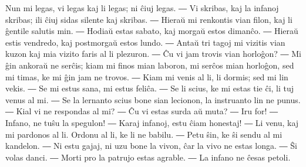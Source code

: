 \newpage %


Nun mi legas, vi legas kaj li legas; ni ĉiuj legas. ― Vi skribas, kaj la infanoj skribas; ili ĉiuj sidas silente kaj skribas. ― Hieraŭ mi renkontis vian filon, kaj li ĝentile salutis min. ― Hodiaŭ estas sabato, kaj morgaŭ estos dimanĉo. ― Hieraŭ estis vendredo, kaj postmorgaŭ estos lundo. ― Antaŭ tri tagoj mi vizitis vian kuzon kaj mia vizito faris al li plezuron. ― Ĉu vi jam trovis vian horloĝon? ― Mi ĝin ankoraŭ ne serĉis; kiam mi finos mian laboron, mi serĉos mian horloĝon, sed mi timas, ke mi ĝin jam ne trovos. ― Kiam mi venis al li, li dormis; sed mi lin vekis. ― Se mi estus sana, mi estus feliĉa. ― Se li scius, ke mi estas tie ĉi, li tuj venus al mi. ― Se la lernanto scius bone sian lecionon, la instruanto lin ne punus. ― Kial vi ne respondas al mi? ― Ĉu vi estas surda aŭ muta? ― Iru for! ― Infano, ne tuŝu la spegulon! ― Karaj infanoj, estu ĉiam honestaj! ― Li venu, kaj mi pardonos al li. Ordonu al li, ke li ne babilu. ― Petu ŝin, ke ŝi sendu al mi kandelon. ― Ni estu gajaj, ni uzu bone la vivon, ĉar la vivo ne estas longa. ― Ŝi volas danci. ― Morti pro la patrujo estas agrable. ― La infano ne ĉesas petoli.


